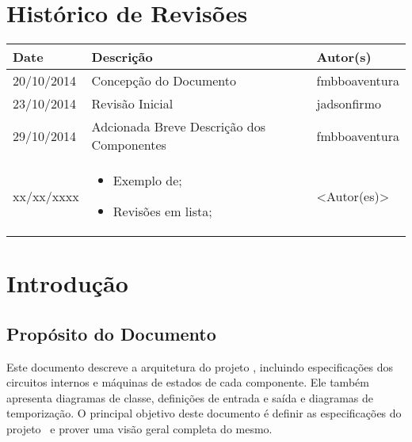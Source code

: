 \documentclass{report}
\begin{document}

\capa
\newpage
\newpage

\chapter*{Histórico de Revisões}
  \vspace*{1cm}
  \begin{table}[ht]
    \centering
    \begin{tabular}[pos]{|m{2cm} | m{8cm} | m{4cm}|} 
      \hline
      \cellcolor[gray]{0.9}
      \textbf{Date} & \cellcolor[gray]{0.9}\textbf{Descrição} & \cellcolor[gray]{0.9}\textbf{Autor(s)}\\
      \hline 20/10/2014 &  Concepção do Documento & fmbboaventura \\ \hline
      		 23/10/2014 &  Revisão Inicial & jadsonfirmo \\ 
      		 \hline 29/10/2014 &  Adcionada Breve Descrição dos Componentes & fmbboaventura \\
      		 \hline       
      		 xx/xx/xxxx &
      \begin{itemize}
        \item Exemplo de;
        \item Revisões em lista;
      \end{itemize}
      & <Autor(es)> \\ \hline 
    \end{tabular}
  \end{table}

\tableofcontents

\chapter{Introdução}
  
  \section{Propósito do Documento}
  Este documento descreve a arquitetura do projeto \ipPROCESSProject, incluindo especificações dos circuitos internos e máquinas de estados de cada componente. Ele também apresenta diagramas de classe, definições de entrada e saída e diagramas de temporização. O principal objetivo deste documento é definir as especificações do projeto \ipPROCESSProject\ e prover uma visão geral completa do mesmo.
\end{document}
